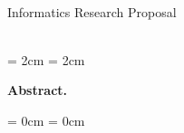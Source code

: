 \thispagestyle{plain}

\begin{center}
  \Huge
  \textbf{\@title}\\
  \vspace{.5em}
  \normalsize
  Informatics Research Proposal\\
  \@author\\
  \@date
  \vspace{.4em}
\end{center}

\newcommand{\abstractmargin}{2cm}

\leftskip  = \abstractmargin
\rightskip = \abstractmargin

\small
\noindent
\textbf{Abstract.}


\leftskip  = 0cm
\rightskip = 0cm
